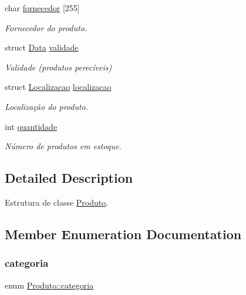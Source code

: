 \begin{DoxyCompactItemize}
\mbox{\label{structProduto_a5d60f1c0d43410808b68de4af0e63d35}} 
char \hyperlink{structProduto_a5d60f1c0d43410808b68de4af0e63d35}{fornecedor} \mbox{[}255\mbox{]}
\begin{DoxyCompactList}\small\item\em Fornecedor do produto. \end{DoxyCompactList}\item 
struct \hyperlink{structData}{Data} \hyperlink{structProduto_aca5e8d3a642cb3e0a0d58141de3321be}{validade}
\begin{DoxyCompactList}\small\item\em Validade (produtos perecíveis) \end{DoxyCompactList}\item 
\mbox{\label{structProduto_a73ba0c69010c8b563bd5ca341b39ae59}} 
struct \hyperlink{structLocalizacao}{Localizacao} \hyperlink{structProduto_a73ba0c69010c8b563bd5ca341b39ae59}{localizacao}
\begin{DoxyCompactList}\small\item\em Localização do produto. \end{DoxyCompactList}\item 
\mbox{\label{structProduto_a3616b391fccbe5dc5843b480088b2c4e}} 
int \hyperlink{structProduto_a3616b391fccbe5dc5843b480088b2c4e}{quantidade}
\begin{DoxyCompactList}\small\item\em Número de produtos em estoque. \end{DoxyCompactList}\end{DoxyCompactItemize}


\subsection{Detailed Description}
Estrutura de classe \hyperlink{structProduto}{Produto}. 

\subsection{Member Enumeration Documentation}
\mbox{\label{structProduto_a790d0998d9d717ef53640efea920b427}} 
\subsubsection{\texorpdfstring{categoria}{categoria}}
{\footnotesize\ttfamily enum \hyperlink{structProduto_a790d0998d9d717ef53640efea920b427}{Produto\+::categoria}}

